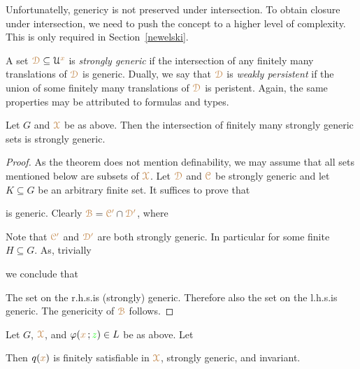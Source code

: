 Unfortunatelly, genericy is not preserved under intersection.
To obtain closure under intersection, we need to push the concept to a higher level of complexity.
This is only required in Section~\ref{newelski}.

A set ${\color{brown}\EuScript D}\subseteq\EuScript U^{\color{brown} x}$ is \emph{strongly generic\/} if the intersection of any finitely many translations of ${\color{brown}\EuScript D}$ is generic.
Dually, we say that ${\color{brown}\EuScript D}$ is \emph{weakly persistent\/} if the union of some finitely many translations of ${\color{brown}\EuScript D}$ is peristent.
Again, the same properties may be attributed to formulas and types.

\begin{lemma}\label{lem_strongly_generic}
  Let $G$ and ${\color{brown}\EuScript X}$ be as above.
  Then the intersection of finitely many strongly generic sets is strongly generic.
\end{lemma}

\begin{proof}
  As the theorem does not mention definability, we may assume that all sets mentioned below are subsets of ${\color{brown}\EuScript X}$.
  Let ${\color{brown}\EuScript D}$ and ${\color{brown}\EuScript C}$ be strongly generic and let $K\subseteq G$ be an arbitrary finite set.
  It suffices to prove that 
  

  is generic. 
  Clearly ${\color{brown}\EuScript B}={\color{brown}\EuScript C'}\cap{\color{brown}\EuScript D'}$, where
  

  Note that ${\color{brown}\EuScript C'}$ and ${\color{brown}\EuScript D'}$ are both strongly generic.
  In particular  for some finite $H\subseteq G$.
  As, trivially


  we conclude that
  

  The set on the r.h.s.\@ is (strongly) generic.
  Therefore also the set on the l.h.s.\@ is generic.
  The genericity of ${\color{brown}\EuScript B}$ follows.
\end{proof}

\begin{corollary}\label{corol_str_gen}
  Let $G$, ${\color{brown}\EuScript X}$, and $\varphi({\color{brown} x}\,;{\color{green} z})\in L$ be as above.
  Let 
  

  Then $q({\color{brown} x})$ is finitely satisfiable in ${\color{brown}\EuScript X}$, strongly generic, and invariant.
\end{corollary}


